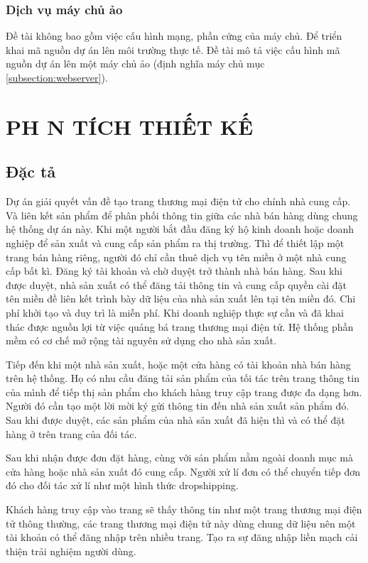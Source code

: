 \documentclass[11pt]{report}
\begin{document}
	\subsection{Dịch vụ máy chủ ảo}
	Đề tài không bao gồm việc cấu hình mạng, phần cứng của máy chủ. Để triển khai mã nguồn dự án lên môi trường thực tế. Đề tài mô tả việc cấu hình mã nguồn dự án lên một máy chủ ảo (định nghĩa máy chủ mục \ref{subsection:webserver}).
	
	\chapter{PH N TÍCH THIẾT KẾ}
	\section{Đặc tả}
	
	Dự án giải quyết vấn đề tạo trang thương mại điện tử cho chính nhà cung cấp. Và liên kết sản phẩm để phân phối thông tin giữa các nhà bán hàng dùng chung hệ thống dự án này. Khi một người bắt đầu đăng ký hộ kinh doanh hoặc doanh nghiệp để sản xuất và cung cấp sản phẩm ra thị trường. Thì để thiết lập một trang bán hàng riêng, người đó chỉ cần thuê dịch vụ tên miền ở một nhà cung cấp bất kì. Đăng ký tài khoản và chờ duyệt trở thành nhà bán hàng. Sau khi được duyệt, nhà sản xuất có thể đăng tải thông tin và cung cấp quyền cài đặt tên miền đề liên kết trình bày dữ liệu của nhà sản xuất lên tại tên miền đó. Chi phí khởi tạo và duy trì là miễn phí. Khi doanh nghiệp thực sự cần và đã khai thác được nguồn lợi từ việc quảng bá trang thương mại điện tử. Hệ thống phần mềm có cơ chế mở rộng tài nguyên sử dụng cho nhà sản xuất.
	
	Tiếp đến khi một nhà sản xuất, hoặc một cửa hàng có tài khoản nhà bán hàng trên hệ thống. Họ có nhu cầu đăng tải sản phẩm của tối tác trên trang thông tin của mình để tiếp thị sản phẩm cho khách hàng truy cập trang được đa dạng hơn. Người đó cần tạo một lời mời ký gửi thông tin đến nhà sản xuất sản phẩm đó. Sau khi được duyệt, các sản phẩm của nhà sản xuất đã hiện thì và có thể đặt hàng ở trên trang của đối tác.
	
	Sau khi nhận được đơn đặt hàng, cùng với sản phẩm nằm ngoài doanh mục mà cửa hàng hoặc nhà sản xuất đó cung cấp. Người xử lí đơn có thể chuyển tiếp đơn đó cho đối tác xử lí như một hình thức dropshipping.
	
	Khách hàng truy cập vào trang sẽ thấy thông tin như một trang thương mại điện tử thông thường, các trang thương mại điện tử này dùng chung dữ liệu nên một tài khoản có thể đăng nhập trên nhiều trang. Tạo ra sự đăng nhập liền mạch cải thiện trải nghiệm người dùng.
	
\end{document}
